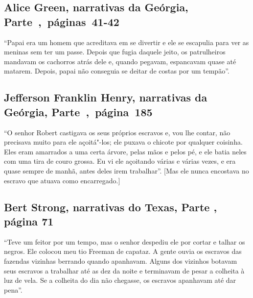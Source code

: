 \subsection{Alice Green, narrativas da Geórgia, Parte~,~páginas~41-42}
\label{ref109}

``Papai era um homem que acreditava em se divertir e ele se escapulia
para ver as meninas sem ter um passe. Depois que fugia daquele jeito, os
patrulheiros mandavam os cachorros atrás dele e, quando pegavam,
espancavam quase até matarem. Depois, papai não conseguia se deitar de
costas por um tempão''.

\subsection{Jefferson Franklin Henry, narrativas da Geórgia, Parte~,~página~185}
\label{ref139}

``O senhor Robert castigava os seus próprios escravos e, vou lhe contar,
não precisava muito para ele açoitá"-los; ele puxava o chicote por
qualquer coisinha. Eles eram amarrados a uma certa árvore, pelas mãos e
pelos pé, e ele batia neles com uma tira de couro grossa. Eu vi ele
açoitando várias e várias vezes, e era quase sempre de manhã, antes
deles irem trabalhar''. {[}Mas ele nunca encostava no escravo que atuava
como encarregado.{]}

\subsection{Bert Strong, narrativas do Texas, Parte , página 71}
\label{ref258}

``Teve um feitor por um tempo, mas o senhor despediu ele por cortar e
talhar os negros. Ele colocou meu tio Freeman de capataz. A gente ouvia
os escravos das fazendas vizinhas berrando quando apanhavam. Alguns dos
vizinhos botavam seus escravos a trabalhar até as dez da noite e
terminavam de pesar a colheita à luz de vela. Se a colheita do dia não
chegasse, os escravos apanhavam até dar pena''.

